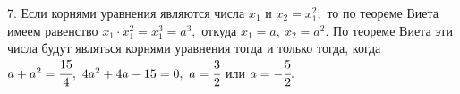 7. Если корнями уравнения являются числа $x_1$ и $x_2=x_1^2,$ то по теореме Виета имеем равенство $x_1\cdot x_1^2=x_1^3=a^3,$ откуда $x_1=a,\ x_2=a^2.$ По теореме Виета эти числа будут являться корнями уравнения тогда и только тогда, когда $a+a^2=\cfrac{15}{4},\ 4a^2+4a-15=0,\ a=\cfrac{3}{2}$ или $a=-\cfrac{5}{2}.$\\
